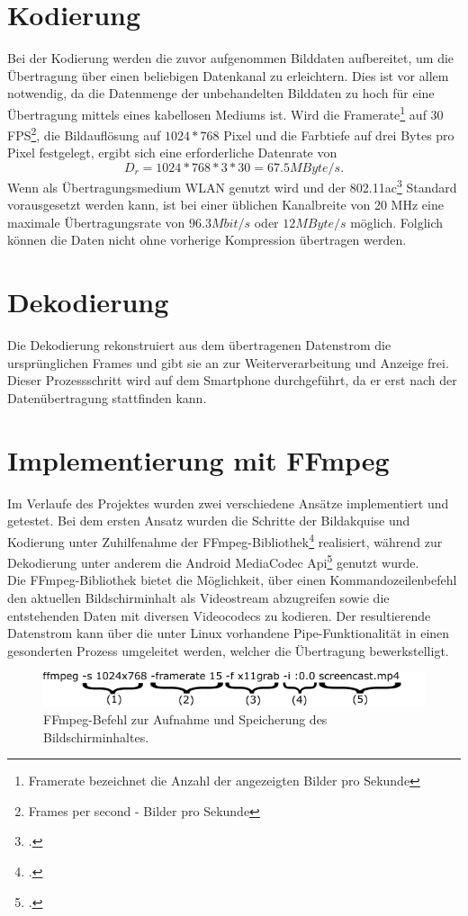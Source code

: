 \section{Kodierung}
Bei der Kodierung werden die zuvor aufgenommen Bilddaten aufbereitet, um die Übertragung über einen beliebigen Datenkanal zu erleichtern. Dies ist vor allem notwendig, da die Datenmenge der unbehandelten Bilddaten zu hoch für eine Übertragung mittels eines kabellosen Mediums ist.  Wird die Framerate\footnote{Framerate bezeichnet die Anzahl der angezeigten Bilder pro Sekunde} auf 30 FPS\footnote{Frames per second - Bilder pro Sekunde}, die Bildauflösung auf $1024*768$ Pixel und die Farbtiefe auf drei Bytes pro Pixel festgelegt, ergibt sich eine erforderliche Datenrate von
\begin{equation}
D_r=1024*768*3*30=67.5 MByte/s.
\end{equation}
Wenn als Übertragungsmedium WLAN genutzt wird und der 802.11ac\footcite{WIFIStandard} Standard vorausgesetzt werden kann, ist bei einer üblichen Kanalbreite von 20 MHz eine maximale Übertragungsrate von $96.3 Mbit/s$ oder $12 MByte/s$ möglich. Folglich können die Daten nicht ohne vorherige Kompression übertragen werden.

\section{Dekodierung}
Die Dekodierung rekonstruiert aus dem übertragenen Datenstrom die ursprünglichen Frames und gibt sie an zur Weiterverarbeitung und Anzeige frei. Dieser Prozessschritt wird auf dem Smartphone durchgeführt, da er erst nach der Datenübertragung stattfinden kann.

\section{Implementierung mit FFmpeg} \label{ImplFFmpeg}
Im Verlaufe des Projektes wurden zwei verschiedene Ansätze implementiert und getestet. Bei dem ersten Ansatz wurden die Schritte der Bildakquise und Kodierung unter Zuhilfenahme der FFmpeg-Bibliothek\footcite{FFmpeg} realisiert, während zur Dekodierung unter anderem die Android MediaCodec Api\footcite{AndroidMediaCodec} genutzt wurde.\\
Die FFmpeg-Bibliothek bietet die Möglichkeit, über einen Kommandozeilenbefehl den aktuellen Bildschirminhalt als Videostream abzugreifen sowie die entstehenden Daten mit diversen Videocodecs zu kodieren. Der resultierende Datenstrom kann über die unter Linux vorhandene Pipe-Funktionalität in einen gesonderten Prozess umgeleitet werden, welcher die Übertragung bewerkstelligt.\\
\begin{figure}[H]
	\includegraphics[width=1\textwidth]{Bilder/BildakquiseUndDatenaufbereitung/ffmpeg_befehl1.pdf}
	\caption{FFmpeg-Befehl zur Aufnahme und Speicherung des Bildschirminhaltes.}
	\label{fig:FFmpeg_befehl1}
\end{figure}

